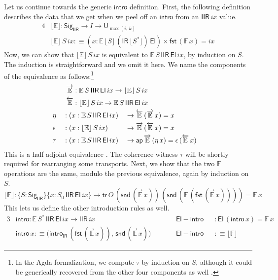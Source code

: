 \documentclass[acmsmall,screen,review]{acmart}
\newcommand{\msf}[1]{{\mathsf{#1}}}
\newcommand{\mbb}[1]{\mathbb{#1}}
\newcommand{\U}{\msf{U}}
\newcommand{\El}{\msf{El}}
\newcommand{\Sig}{\msf{Sig}}
\newcommand{\ix}{{ix}}
\newcommand{\IR}{\msf{IR}}
\newcommand{\intro}{\msf{intro}}
\newcommand{\tr}{\msf{tr}}
\newcommand{\fst}{\msf{fst}}
\newcommand{\snd}{\msf{snd}}
\newcommand{\IIR}{\msf{IIR}}
\newcommand{\floord}[1]{\lfloor #1 \rfloor}
\newcommand{\ora}[1]{\overrightarrow{#1}}
\newcommand{\ola}[1]{\overleftarrow{#1}}
\newcommand{\ap}{\msf{ap}}
\newcommand{\E}{\mbb{E}}
\newcommand{\F}{\mbb{F}}
\begin{document}
Let us continue towards the generic $\intro$ definition. First, the following definition describes the
data that we get when we peel off an $\intro$ from an $\IIR\,\ix$ value.
\begin{alignat*}{4}
  &\floord{\E} : \Sig_\IIR \to I \to \U_{\max(i,\,k)}\\
  &\floord{\E}\,S\,\ix :\equiv (x : \E\,\floord{S}\,(\IR\,\floord{S^*})\,\El) \times \fst\,(\F\,x) = \ix
\end{alignat*}
Now, we can show that $\floord{\E}\,S\,\ix$ is equivalent to $\E\,S\,\IIR\,\El\,\ix$, by induction on
$S$. The induction is straightforward and we omit it here. We name the components of the equivalence
as follows:\footnote{In the Agda formalization, we compute $\tau$ by induction on $S$, although it
could be generically recovered from the other four components as well \cite[Section~4.2]{hottbook}.}
\begin{alignat*}{4}
  &\rlap{$\hspace{2em}\ora{\E} : \E\,S\,\IIR\,\El\,\ix \to \floord{\E}\,S\,\ix$} \\
  &\rlap{$\hspace{2em}\ola{\E} : \floord{\E}\,S\,\ix \to \E\,S\,\IIR\,\El\,\ix$} \\
  &\eta      &&: (x : \E\,S\,\IIR\,\El\,\ix) &&\to \ola{\E}\,(\ora{\E}\,x) = x \\
  &\epsilon  &&: (x : \floord{\E}\,S\,\ix)   &&\to \ora{\E}\,(\ola{\E}\,x) = x \\
  &\tau      &&: (x : \E\,S\,\IIR\,\El\,\ix) &&\to \ap\,\ora{\E}\,(\eta\,x) = \epsilon\,(\ola{\E}\,x)
\end{alignat*}
This is a half adjoint equivalence \cite[Section~4.2]{hottbook}. The coherence witness $\tau$ will
be shortly required for rearranging some transports. Next, we show that the two $\F$ operations are
the same, modulo the previous equivalence, again by induction on $S$.
\[\floord{\F} : \{S : \Sig_\IIR\}\{x : S_0\,\IIR\,\El\,\ix\} \to \tr\,O\,(\snd\,(\ora{\E}\,x))\,(\snd\,(\F\,(\fst\,(\ora{\E}\,x)))) = \F\,x\]
This lets us define the other introduction rules as well.
\begin{alignat*}{3}
  &\intro    : \E\,S^*\,\IIR\,\El\,\ix \to \IIR\,\ix && \msf{El\!\!-\!\!intro} && : \El\,(\intro\,x) = \F\,x \\
  &\intro\,x :\equiv \big(\intro_\IR\,(\fst\,(\ora{\E}\,x)),\,\snd\,(\ora{\E}\,x)\big) \quad\quad&& \msf{El\!\!-\!\!intro} && :\equiv \floord{\F}
\end{alignat*}
\end{document}
